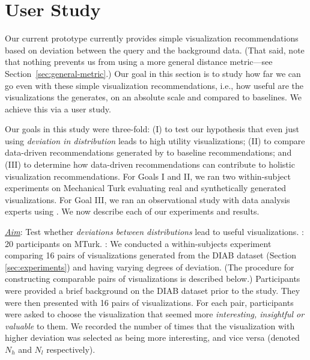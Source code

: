 
\section{User Study}
\label{sec:user_study}

Our current \SeeDB prototype currently provides 
simple visualization recommendations based on 
deviation between the query and the background data.
(That said, note that nothing prevents us from using a more general
distance metric---see Section~\ref{sec:general-metric}.)
Our goal in this section is to study how
far we can go even with these simple visualization
recommendations, i.e., how useful are the 
visualizations the \SeeDB generates, on an absolute scale
and compared to baselines. 
We achieve this via a user study. 

Our goals in this study were three-fold: 
(I) to test our hypothesis that even just using 
{\it deviation in distribution} 
leads to high utility visualizations;
(II) to compare data-driven recommendations generated 
by \SeeDB to baseline recommendations; and 
(III) to determine how data-driven 
recommendations can contribute to 
holistic visualization recommendations. 
For Goals I and II, we ran two within-subject\cite{} experiments on Mechanical Turk\cite{} evaluating real and synthetically generated visualizations.
For Goal III, we ran an observational study 
with data analysis experts using \SeeDB.
We now describe each of our experiments and results.



{\it \underline{Aim}}: Test whether {\it deviations between distributions} lead to useful visualizations.
: 20 participants on MTurk.
: 
We conducted a within-subjects experiment 
comparing 16 pairs of visualizations generated 
from the DIAB dataset (Section \ref{sec:experiments}) 
and having varying degrees of deviation. 
(The procedure for constructing comparable pairs of visualizations is described below.)
Participants were provided a brief background on the DIAB dataset prior to the study.
They were then presented with 16 pairs of visualizations. 
For each pair, participants were asked to choose the visualization that seemed more {\it interesting, insightful or valuable} to them.
We recorded the number of times that the visualization with higher deviation was selected as being more interesting, and vice versa (denoted $N_h$ and $N_l$ respectively).


